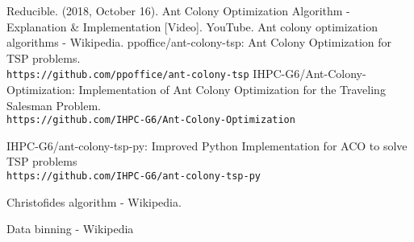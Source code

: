 \documentclass[conference]{IEEEtran}
\begin{document}
\begin{thebibliography}{9}
Reducible. (2018, October 16). Ant Colony Optimization Algorithm - Explanation \& Implementation [Video]. YouTube.
Ant colony optimization algorithms - Wikipedia.
ppoffice/ant-colony-tsp: Ant Colony Optimization for TSP problems.
\\\texttt{https://github.com/ppoffice/ant-colony-tsp}
IHPC-G6/Ant-Colony-Optimization: Implementation of Ant Colony Optimization for the Traveling Salesman Problem.
\\\texttt{https://github.com/IHPC-G6/Ant-Colony-Optimization}

IHPC-G6/ant-colony-tsp-py: Improved Python Implementation for ACO to solve TSP problems
\\\texttt{https://github.com/IHPC-G6/ant-colony-tsp-py}

Christofides algorithm - Wikipedia.

Data binning - Wikipedia

\end{thebibliography}
\end{document}
